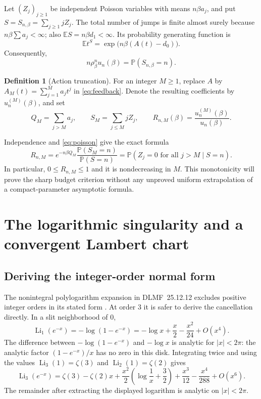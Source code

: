 \documentclass[11pt,a4paper]{article}
\numberwithin{equation}{section}
\theoremstyle{definition}
\newtheorem{definition}[theorem]{Definition}
\theoremstyle{remark}
\DeclareMathOperator{\Li}{Li}
\newcommand{\E}{\mathbb E}
\newcommand{\Prob}{\mathbb P}
\begin{document}
Let $(Z_j)_{j\ge1}$ be independent Poisson variables with means
$n\beta a_j$, and put $S=S_{n,\beta}=\sum_{j\ge1}jZ_j$. The total number
of jumps is finite almost surely because $n\beta\sum a_j<\infty$; also
$\E S=n\beta d_1<\infty$. Its probability generating function is
\[
 \E t^S=\exp\bigl(n\beta(A(t)-d_0)\bigr).
\]
Consequently,
\begin{equation}\label{eq:poisson}
 \boxed{\quad n\rho_\beta^n u_n(\beta)=\Prob(S_{n,\beta}=n).\quad}
\end{equation}

\begin{definition}[Action truncation]
For an integer $M\ge1$, replace $A$ by
$A_M(t)=\sum_{j=1}^M a_jt^j$ in \eqref{eq:feedback}. Denote the resulting
coefficients by $u_n^{(M)}(\beta)$, and set
\[
 Q_M=\sum_{j>M}a_j,\qquad S_M=\sum_{j\le M}jZ_j,\qquad
 R_{n,M}(\beta)=\frac{u_n^{(M)}(\beta)}{u_n(\beta)}.
\]
\end{definition}
Independence and \eqref{eq:poisson} give the exact formula
\begin{equation}\label{eq:cutoff-exact}
 \boxed{\quad
 R_{n,M}=e^{-n\beta Q_M}
 \frac{\Prob(S_M=n)}{\Prob(S=n)}
 =\Prob(Z_j=0\text{ for all }j>M\mid S=n).
 \quad}
\end{equation}
In particular, $0\le R_{n,M}\le1$ and it is nondecreasing in $M$. This
monotonicity will prove the sharp budget criterion without any unproved
uniform extrapolation of a compact-parameter asymptotic formula.

\section{The logarithmic singularity and a convergent Lambert chart}
\label{sec:chart}

\subsection{Deriving the integer-order normal form}
The nonintegral polylogarithm expansion in DLMF~25.12.12 excludes positive
integer orders in its stated form \cite{dlmfpoly}. At order $3$ it is
safer to derive the cancellation directly. In a slit neighborhood of $0$,
\[
 \Li_1(e^{-x})=-\log(1-e^{-x})
 =-\log x+\frac x2-\frac{x^2}{24}+O(x^4).
\]
The difference between $-\log(1-e^{-x})$ and $-\log x$ is analytic for
$|x|<2\pi$: the analytic factor $(1-e^{-x})/x$ has no zero in this disk.
Integrating twice and using the values $\Li_3(1)=\zeta(3)$ and
$\Li_2(1)=\zeta(2)$ gives
\begin{equation}\label{eq:li3}
 \Li_3(e^{-x})=\zeta(3)-\zeta(2)x
 +\frac{x^2}{2}\left(\log\frac1x+\frac32\right)
 +\frac{x^3}{12}-\frac{x^4}{288}+O(x^6).
\end{equation}
The remainder after extracting the displayed logarithm is analytic on
$|x|<2\pi$.
\end{document}
